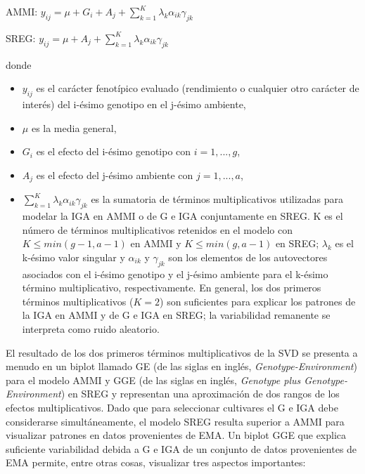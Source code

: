 \hspace{0.5cm} AMMI: $y_{ij}= \mu + G_i + A_j + \sum_{k=1}^K \lambda_k \alpha_{ik} \gamma_{jk}$

\hspace{0.5cm} SREG: $y_{ij}= \mu + A_j + \sum_{k=1}^K \lambda_k \alpha_{ik} \gamma_{jk}$ 

donde 
\begin{itemize}
\item $y_{ij}$ es el carácter fenotípico evaluado (rendimiento o cualquier otro carácter de interés) del i-ésimo genotipo en el j-ésimo ambiente,
\item $\mu$ es la media general,
\item  $G_i$ es el efecto del i-ésimo genotipo con $i=1,...,g$,
\item $A_j$ es el efecto del j-ésimo ambiente con $j=1,...,a$,
\item $\sum_{k=1}^K \lambda_k \alpha_{ik} \gamma_{jk}$ es la sumatoria de términos multiplicativos utilizadas para modelar la IGA en AMMI o de G e IGA conjuntamente en SREG. K es el número de términos multiplicativos retenidos en el modelo con $K \leq min(g-1,a-1)$ en AMMI y $K \leq min(g,a-1)$ en SREG; $\lambda_k$ es el k-ésimo valor singular y $\alpha_{ik}$ y $\gamma_{jk}$ son los elementos de los autovectores asociados con el i-ésimo genotipo y el j-ésimo ambiente para el k-ésimo término multiplicativo, respectivamente. En general, los dos primeros términos multiplicativos ($K=2$) son suficientes para explicar los patrones de la IGA en AMMI y de G e IGA en SREG; la variabilidad remanente se interpreta como ruido aleatorio. 
\end{itemize}


El resultado de los dos primeros términos multiplicativos de la SVD se presenta a menudo en un biplot llamado GE (de las siglas en inglés, \emph{Genotype-Environment}) para el modelo AMMI \citep{Zobel1988} y GGE (de las siglas en inglés, \emph{Genotype plus Genotype-Environment}) en SREG \citep{Yanetal2000} y representan una aproximación de dos rangos de los efectos multiplicativos. Dado que para seleccionar cultivares el G e IGA debe considerarse simultáneamente, el modelo SREG resulta superior a AMMI para visualizar patrones en datos provenientes de EMA. Un biplot GGE que explica suficiente variabilidad debida a G e IGA de un conjunto de datos provenientes de EMA permite, entre otras cosas, visualizar tres aspectos importantes: 

